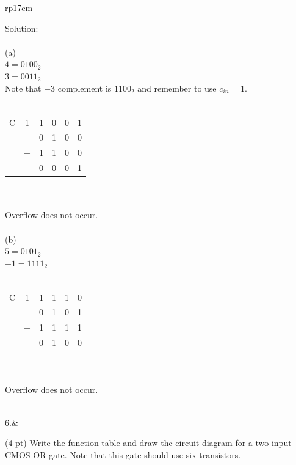 \documentclass{article}
\begin{document}
\begin{longtable}[l]{rp{17cm}}
\begin{minipage}[t]{\linewidth}
Solution: \\
\\
(a)\\
$4 = 0100_2$\\
$3 = 0011_2$\\
Note that $-3$ complement is $1100_2$ and remember to use $c_{in}=1$.\\
\\
\begin{tabular}{cccccc}
  C & 1 & 1 & 0 & 0 & 1 \\
    &   & 0 & 1 & 0 & 0 \\
    & + & 1 & 1 & 0 & 0 \\
  \hline
    &   & 0 & 0 & 0 & 1 \\
\end{tabular} \\
\\
Overflow does not occur.\\
\\
(b)\\
$5 = 0101_2$\\
$-1 = 1111_2$\\
\\
\begin{tabular}{cccccc}
  C & 1 & 1 & 1 & 1 & 0 \\
    &   & 0 & 1 & 0 & 1 \\
    & + & 1 & 1 & 1 & 1 \\
  \hline
    &   & 0 & 1 & 0 & 0 \\
\end{tabular} \\
\\
Overflow does not occur.\\
\end{minipage}\\
\medskip
6.&\begin{minipage}[t]{\linewidth}(4 pt) Write the function table and draw the circuit diagram for a two input CMOS OR gate.  Note that this gate should use six transistors.\\ \\


\end{minipage}
\end{longtable}
\end{document}
